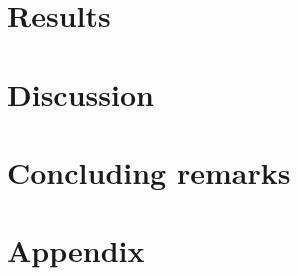 \documentclass[twocolumn,english,notitlepage]{article}
\begin{document}
\section{Results}


\section{Discussion}


\section{Concluding remarks} 

\clearpage

\newpage

\renewcommand{\theequation}{\thesection.\arabic{equation}}
\newpage

\section{Appendix}
\begin{appendices}
     
\end{appendices}
\end{document}
